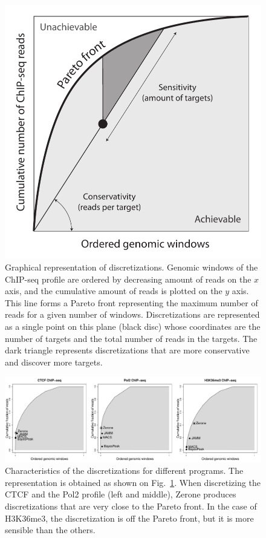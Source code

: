 \documentclass{bioinfo}
\begin{document}
\begin{figure}[!tpb]
\centerline{\includegraphics[scale=0.5]{pareto_front_explanation.pdf}}
\caption{
  Graphical representation of discretizations. Genomic
  windows of the ChIP-seq profile are ordered by decreasing amount of
  reads on the $x$ axis, and the cumulative amount of reads is plotted
  on the $y$ axis. This line forms a Pareto front representing the
  maximum number of reads for a given number of windows. Discretizations
  are represented as a single point on this plane (black disc) whose
  coordinates are the number of targets and the total number of reads
  in the targets. The dark triangle represents discretizations that
  are more conservative and discover more targets.
}
\label{fig:expl}
\end{figure}

\begin{figure}
\centerline{\includegraphics[scale=0.4]{pareto_front.pdf}}
\caption{
  Characteristics of the discretizations for different programs.
  The representation is obtained as shown on Fig.~\ref{fig:expl}.
  When discretizing the CTCF and the Pol2 profile (left and middle),
  Zerone produces discretizations that are very close to the Pareto
  front. In the case of H3K36me3, the discretization is off the
  Pareto front, but it is more sensible than the others.
}
\label{fig:pareto}
\end{figure}
\end{document}
